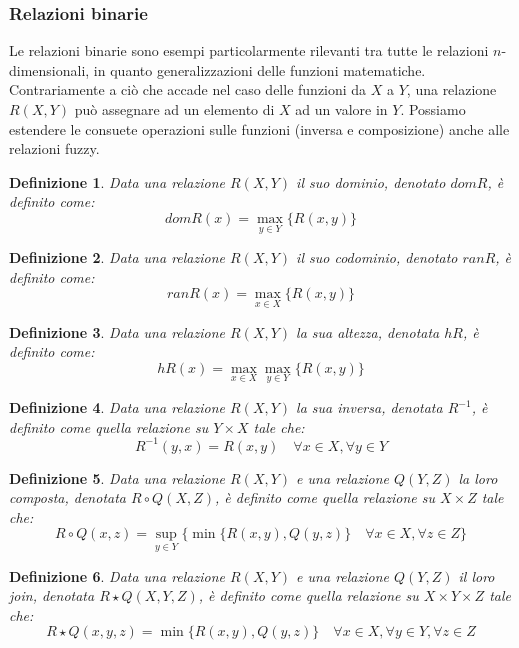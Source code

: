 \documentclass[10pt,a4paper]{article}
\newtheorem{definition}{Definizione}
\begin{document}
\subsubsection{Relazioni binarie}

Le relazioni binarie sono esempi particolarmente rilevanti tra tutte le relazioni $n$-dimensionali, in quanto generalizzazioni delle funzioni matematiche. Contrariamente a ciò che accade nel caso delle funzioni da $X$ a $Y$, una relazione $R(X,Y)$ può assegnare ad un elemento di $X$ ad un valore in $Y$. Possiamo estendere le consuete operazioni sulle funzioni (inversa e composizione) anche alle relazioni fuzzy. 

\begin{definition}
Data una relazione $R(X,Y)$ il suo \emph{dominio}, denotato $dom R$, è definito come:
$$
dom R(x) = \max_{y \in Y}\{ R(x,y) \}
$$
\end{definition}

\begin{definition}
Data una relazione $R(X,Y)$ il suo \emph{codominio}, denotato $ran R$, è definito come:
$$
ran R(x) = \max_{x \in X}\{ R(x,y) \}
$$
\end{definition}

\begin{definition}
Data una relazione $R(X,Y)$ la sua \emph{altezza}, denotata $h R$, è definito come:
$$
h R(x) = \max_{x \in X} \max_{y \in Y} \{ R(x,y) \}
$$
\end{definition}

\begin{definition}
Data una relazione $R(X,Y)$ la sua \emph{inversa}, denotata $R^{-1}$, è definito come quella relazione su $Y \times X$ tale che:
$$
R^{-1} (y,x) = R(x,y) \quad \forall x \in X, \forall y \in Y
$$
\end{definition}

\begin{definition}
Data una relazione $R(X,Y)$ e una relazione $Q(Y,Z)$ la loro \emph{composta}, denotata $R \circ Q (X,Z)$, è definito come quella relazione su $X \times Z$ tale che:
$$
R \circ Q (x,z) = \sup_{y \in Y} \{ \min \{ R(x,y),Q(y,z)\} \quad \forall x \in X, \forall z \in Z \} 
$$
\end{definition}

\begin{definition}
Data una relazione $R(X,Y)$ e una relazione $Q(Y,Z)$ il loro \emph{join}, denotata $R \star Q (X,Y,Z)$, è definito come quella relazione su $X \times Y \times Z$ tale che:
$$
R \star Q (x,y,z) = \min \{ R(x,y),Q(y,z)\} \quad \forall x \in X, \forall y \in Y, \forall z \in Z 
$$
\end{definition}
\end{document}
